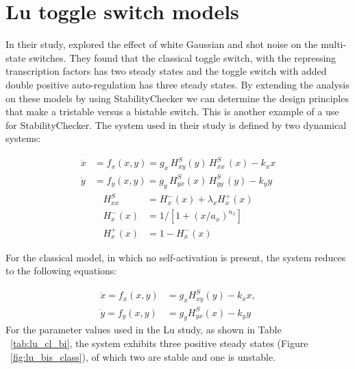 \section{Lu toggle switch models}

In their study, \textcite{Lu:2013br} explored the effect of white Gaussian and shot noise on the multi-state switches. They found that the classical toggle switch, with the repressing transcription factors has two steady states and the toggle switch with added double positive auto-regulation has three steady states. By extending the analysis on these models by using StabilityChecker we can determine the design principles that make a tristable versus a bistable switch. This is another example of a use for StabilityChecker.
The system used in their study is defined by two dynamical systems:

\begin{align}
\dot{x} &= f_{x}(x,y) =g_{x}\, H^{S}_{xy}(y)\, H^{S}_{xx}\,(x)-k_{x}x \label{eq:lu_both_1} \\
\dot{y} &= f_{y}(x,y) =g_{y}\,H^{S}_{yx}(x)\,H^{S}_{yy}\,(y)-k_{y}y \label{eq:lu_both_2}
\end{align}
\begin{align}
H^{S}_{xx} &= H^{-}_{x}(x)+\lambda_{x}H^{+}_{x}(x)\label{eq:lu_hsxx}\\
H^{-}_{x}(x) &= 1 \big/\left[1+(x/a_{x})^{n_{x}}\right]\label{eq:lu_hpx}\\
H^{+}_{x}(x) &= 1-H^{-}_{x}(x)\label{eq:lu_hmx}
\end{align}

For the classical model, in which no self-activation is present, the system reduces to the following equations:

\begin{align}
\dot{x}=f_{x}(x,y) &= g_{x}H^{S}_{xy}(y)-k_{x}x,\label{eq:lu_cl_1}\\
\dot{y}=f_{y}(x,y) &= g_{y}H^{S}_{yx}(x)-k_{y}y\label{eq:lu_cl_2}
\end{align}
For the parameter values used in the Lu study, as shown in Table ~\ref{tab:lu_cl_bi}, the system exhibits three positive steady states (Figure ~\ref{fig:lu_bis_class}), of which two are stable and one is unstable. 

